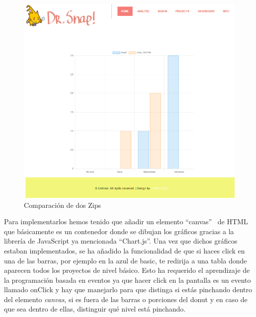 \documentclass[a4paper, 12pt]{book}
\begin{document}
\begin{itemize}
         \begin{figure}[h]
            \centering
            \includegraphics[scale=0.4]{img/comparar.PNG}
            \caption{Comparación de dos Zips}
            \label{figura:dshboard}
        \end{figure}
       
    \end{itemize}
    Para implementarlos hemos tenido que añadir un elemento ``canvas''~ de HTML que básicamente es un contenedor donde se dibujan los gráficos gracias a la librería de JavaScript ya mencionada ``Chart.js''. Una vez que dichos gráficos estaban implementados, se ha añadido la funcionalidad de que si haces click en una de las barras, por ejemplo en la azul de basic, te redirija a una tabla donde aparecen todos los proyectos de nivel básico. Esto ha requerido el aprendizaje de la programación basada en eventos ya que hacer click en la pantalla es un evento llamado onClick y hay que manejarlo para que distinga si estás pinchando dentro del elemento \textit{canvas}, si es fuera de las barras o porciones del donut y en caso de que sea dentro de ellas, distinguir qué nivel está pinchando.



\end{document}
